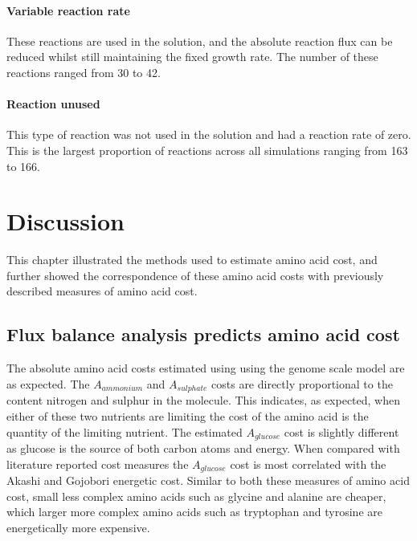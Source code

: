 \paragraph{Variable reaction rate}

These reactions are used in the solution, and the absolute reaction flux can be reduced whilst still maintaining the fixed growth rate. The number of these reactions ranged from 30 to 42.

\paragraph{Reaction unused}

This type of reaction was not used in the solution and had a reaction rate of zero. This is the largest proportion of reactions across all simulations ranging from 163 to 166.

\clearpage

\section{Discussion}

This chapter illustrated the methods used to estimate amino acid cost, and further showed the correspondence of these amino acid costs with previously described measures of amino acid cost.

\subsection{Flux balance analysis predicts amino acid cost}

The absolute amino acid costs estimated using using the genome scale model are as expected. The $A_{ammonium}$ and $A_{sulphate}$ costs are directly proportional to the content nitrogen and sulphur in the molecule. This indicates, as expected, when either of these two nutrients are limiting the cost of the amino acid is the quantity of the limiting nutrient. The estimated $A_{glucose}$ cost is slightly different as glucose is the source of both carbon atoms and energy. When compared with literature reported cost measures the $A_{glucose}$ cost is most correlated with the Akashi and Gojobori energetic cost. Similar to both these measures of amino acid cost, small less complex amino acids such as glycine and alanine are cheaper, which larger more complex amino acids such as tryptophan and tyrosine are energetically more expensive.

